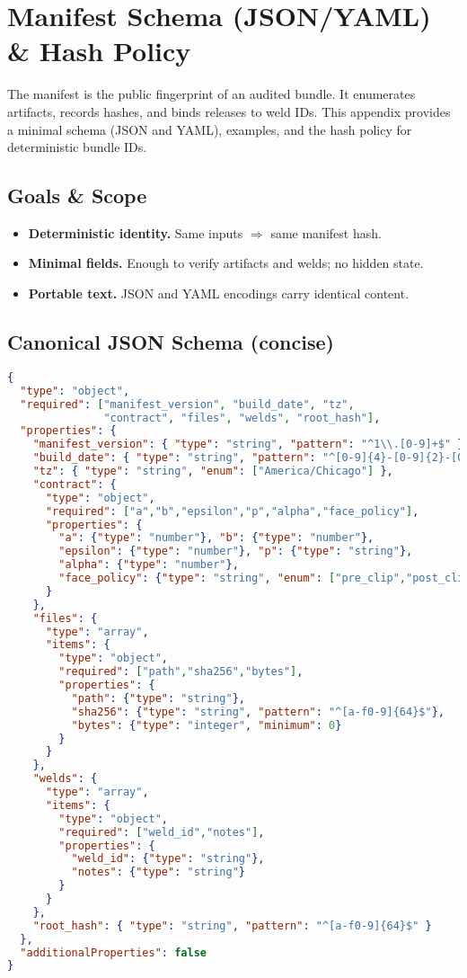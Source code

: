 \chapter{Manifest Schema (JSON/YAML) \& Hash Policy}
\label{apx:manifest}

The manifest is the public fingerprint of an audited bundle. It enumerates artifacts, records hashes, and binds releases to weld IDs. This appendix provides a minimal schema (JSON and YAML), examples, and the hash policy for deterministic bundle IDs.

\section{Goals \& Scope}
\label{sec:manifest-goals}

\begin{itemize}[leftmargin=1.25em]
  \item \textbf{Deterministic identity.} Same inputs \(\Rightarrow\) same manifest hash.
  \item \textbf{Minimal fields.} Enough to verify artifacts and welds; no hidden state.
  \item \textbf{Portable text.} JSON and YAML encodings carry identical content.
\end{itemize}

\section{Canonical JSON Schema (concise)}
\label{sec:manifest-jsonschema}

\begin{lstlisting}[language=json,caption={JSON Schema (concise).},label={lst:manifest-schema}]
{
  "type": "object",
  "required": ["manifest_version", "build_date", "tz",
               "contract", "files", "welds", "root_hash"],
  "properties": {
    "manifest_version": { "type": "string", "pattern": "^1\\.[0-9]+$" },
    "build_date": { "type": "string", "pattern": "^[0-9]{4}-[0-9]{2}-[0-9]{2}$" },
    "tz": { "type": "string", "enum": ["America/Chicago"] },
    "contract": {
      "type": "object",
      "required": ["a","b","epsilon","p","alpha","face_policy"],
      "properties": {
        "a": {"type": "number"}, "b": {"type": "number"},
        "epsilon": {"type": "number"}, "p": {"type": "string"},
        "alpha": {"type": "number"},
        "face_policy": {"type": "string", "enum": ["pre_clip","post_clip+guard"]}
      }
    },
    "files": {
      "type": "array",
      "items": {
        "type": "object",
        "required": ["path","sha256","bytes"],
        "properties": {
          "path": {"type": "string"},
          "sha256": {"type": "string", "pattern": "^[a-f0-9]{64}$"},
          "bytes": {"type": "integer", "minimum": 0}
        }
      }
    },
    "welds": {
      "type": "array",
      "items": {
        "type": "object",
        "required": ["weld_id","notes"],
        "properties": {
          "weld_id": {"type": "string"},
          "notes": {"type": "string"}
        }
      }
    },
    "root_hash": { "type": "string", "pattern": "^[a-f0-9]{64}$" }
  },
  "additionalProperties": false
}
\end{lstlisting}

